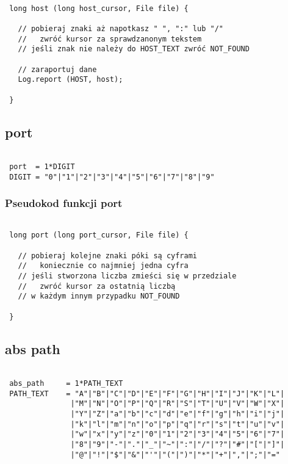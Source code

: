 \documentclass[a4paper,11pt]{report}
\begin{document}
\begin{lstlisting}

 long host (long host_cursor, File file) {
 
   // pobieraj znaki aż napotkasz " ", ":" lub "/"
   //   zwróć kursor za sprawdzanonym tekstem
   // jeśli znak nie należy do HOST_TEXT zwróć NOT_FOUND
   
   // zaraportuj dane
   Log.report (HOST, host);
   
 }

\end{lstlisting}

\subsection{port}

\begin{lstlisting}

 port  = 1*DIGIT
 DIGIT = "0"|"1"|"2"|"3"|"4"|"5"|"6"|"7"|"8"|"9"

\end{lstlisting}

\subsubsection{Pseudokod funkcji port}

\begin{lstlisting}

 long port (long port_cursor, File file) {
 
   // pobieraj kolejne znaki póki są cyframi
   //   koniecznie co najmniej jedna cyfra
   // jeśli stworzona liczba zmieści się w przedziale
   //   zwróć kursor za ostatnią liczbą
   // w każdym innym przypadku NOT_FOUND
      
 }

\end{lstlisting}

\subsection{abs path}

\begin{lstlisting}

 abs_path     = 1*PATH_TEXT
 PATH_TEXT    = "A"|"B"|"C"|"D"|"E"|"F"|"G"|"H"|"I"|"J"|"K"|"L"|
               |"M"|"N"|"O"|"P"|"Q"|"R"|"S"|"T"|"U"|"V"|"W"|"X"|
               |"Y"|"Z"|"a"|"b"|"c"|"d"|"e"|"f"|"g"|"h"|"i"|"j"|
               |"k"|"l"|"m"|"n"|"o"|"p"|"q"|"r"|"s"|"t"|"u"|"v"|
               |"w"|"x"|"y"|"z"|"0"|"1"|"2"|"3"|"4"|"5"|"6"|"7"|
               |"8"|"9"|"-"|"."|"_"|"~"|":"|"/"|"?"|"#"|"["|"]"|
               |"@"|"!"|"$"|"&"|"'"|"("|")"|"*"|"+"|","|";"|"="

\end{lstlisting}
\end{document}
